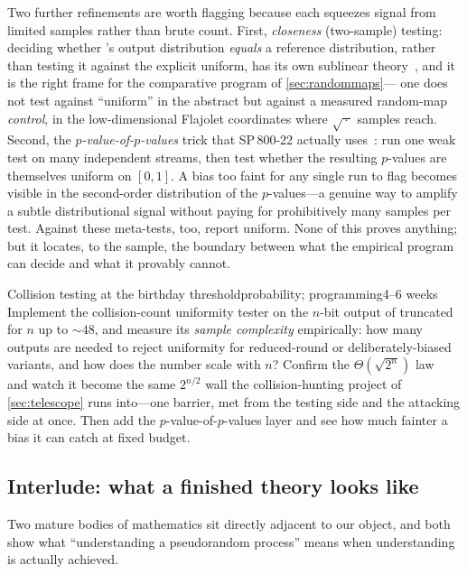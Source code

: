 Two further refinements are worth flagging because each squeezes signal
from limited samples rather than brute count. First, \emph{closeness}
(two-sample) testing: deciding whether \SHA{}'s output distribution
\emph{equals} a reference distribution, rather than testing it against
the explicit uniform, has its own sublinear theory~\citep{Batu2013}, and
it is the right frame for the comparative program of \cref{sec:randommaps}---%
one does not test \SHA{} against ``uniform'' in the abstract but against
a measured random-map \emph{control}, in the low-dimensional Flajolet
coordinates where $\sqrt{\,\cdot\,}$ samples reach. Second, the
\emph{$p$-value-of-$p$-values} trick that SP\,800-22 actually
uses~\citep{NIST2010}: run one weak test on many independent streams,
then test whether the resulting $p$-values are themselves uniform on
$[0,1]$. A bias too faint for any single run to flag becomes visible in
the second-order distribution of the $p$-values---a genuine way to
amplify a subtle distributional signal without paying for
prohibitively many samples per test. Against \SHA{} these meta-tests, too,
report uniform. None of this proves anything; but it locates, to the
sample, the boundary between what the empirical program can decide and
what it provably cannot.

\begin{project}{Collision testing at the birthday threshold}{probability;
  programming}{4--6 weeks}
  Implement the collision-count uniformity tester on the $n$-bit output
  of truncated \SHA{} for $n$ up to ${\sim}48$, and measure its
  \emph{sample complexity} empirically: how many outputs are needed to
  reject uniformity for reduced-round or deliberately-biased variants,
  and how does the number scale with $n$? Confirm the
  $\Theta(\sqrt{2^{n}})$ law~\citep{Canonne2020} and watch it become the
  same $2^{n/2}$ wall the collision-hunting project of
  \cref{sec:telescope} runs into---one barrier, met from the
  testing side and the attacking side at once. Then add the
  $p$-value-of-$p$-values layer and see how much fainter a bias it can
  catch at fixed budget.
\end{project}

\subsection{Interlude: what a finished theory looks like}\label{sec:prngs}

Two mature bodies of mathematics sit directly adjacent to our object,
and both show what ``understanding a pseudorandom process'' means when
understanding is actually achieved.

